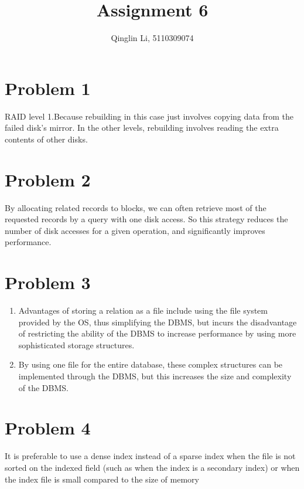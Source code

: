 \documentclass[a4paper,11pt]{article}
\begin{document}
 
\pagestyle{fancy}
\rfoot{\thepage}
\setlength{\parskip}{0.7ex plus0.2ex minus0.2ex}
\cfoot{\empty}
\lhead{\empty}
 
 
\title{Assignment 6}
\author{Qinglin Li, 5110309074}
\date{}
\maketitle
 
\headheight 3pt
\thispagestyle{fancy}
\section*{Problem 1}
RAID level 1.Because rebuilding in this case just involves copying data from the failed disk's mirror. In the other levels, rebuilding involves reading the extra contents of other disks.

\section*{Problem 2}
By allocating related records to blocks, we can often retrieve most of the requested records by a query with one disk access. So this strategy reduces the number of disk accesses for a given operation, and significantly improves performance.

\section*{Problem 3}
\begin{enumerate}
\item 
Advantages of storing a relation as a file include using the file system provided by the OS, thus simplifying the DBMS, but incurs the disadvantage of restricting the ability of the DBMS to increase performance by using more sophisticated storage structures.
\item
By using one file for the entire database, these complex structures can be implemented through the DBMS, but this increases the size and complexity of the DBMS. 
\end{enumerate}

\section*{Problem 4}
It is preferable to use a dense index instead of a sparse index when the file is not sorted on the indexed field (such as when the index is a secondary index) or when the index file is small compared to the size of memory
\end{document}
